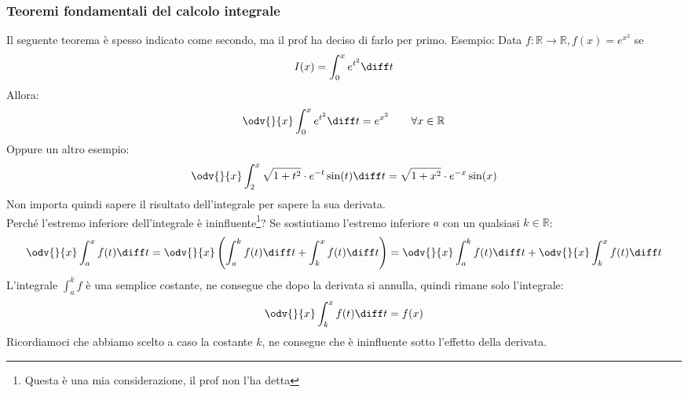 \subsubsection{Teoremi fondamentali del calcolo integrale}
Il seguente teorema è spesso indicato come secondo, ma il prof ha deciso di farlo per primo.
\thm{
	Sia $f:]a,b[ \to \mathbb{R}$ continua e sia $c\in ]a,b[$. Allora vale:
	\begin{equation*}
		I_c'(x) = f(x) \qquad \forall x \in ]a,b[
	\end{equation*}
	Cioè:
	\begin{equation*}
		\odv{}{x} \int_c^x f(t) \diff t = f(x) \qquad \forall x \in ]a,b[
	\end{equation*}
}
Esempio: Data $f:\mathbb{R} \to \mathbb{R}, f(x) = e^{x^2}$ se 
\begin{equation*}
	I(x) = \int_0^x e^{t^2} \diff t
\end{equation*}
Allora:
\begin{equation*}
	\odv{}{x} \int_0^x e^{t^2} \diff t = e^{x^2} \qquad \forall x \in \mathbb{R}
\end{equation*}
Oppure un altro esempio:
\begin{equation*}
	\odv{}{x} \int_2^x \sqrt{1+t^2} \cdot e^{-t} \sin(t) \diff t = \sqrt{1+x^2} \cdot e^{-x} \sin(x)
\end{equation*}
Non importa quindi sapere il risultato dell'integrale per sapere la sua derivata.\\

Perché l'estremo inferiore dell'integrale è ininfluente\footnote{Questa è una mia considerazione, il prof non l'ha detta}? Se sostiutiamo l'estremo inferiore $a$ con un qualsiasi $k \in \mathbb{R}$:
\begin{equation*}
	\odv{}{x} \int_a^x f(t) \diff t = \odv{}{x} \left(\int_a^k f(t) \diff t + \int_k^x f(t) \diff t\right) = \odv{}{x} \int_a^k f(t) \diff t + \odv{}{x} \int_k^x f(t) \diff t
\end{equation*}
L'integrale $\int_a^k f$ è una semplice costante, ne consegue che dopo la derivata si annulla, quindi rimane solo l'integrale:
\begin{equation*}
	\odv{}{x} \int_k^x f(t) \diff t = f(x)
\end{equation*}
Ricordiamoci che abbiamo scelto a caso la costante $k$, ne consegue che è ininfluente sotto l'effetto della derivata.

